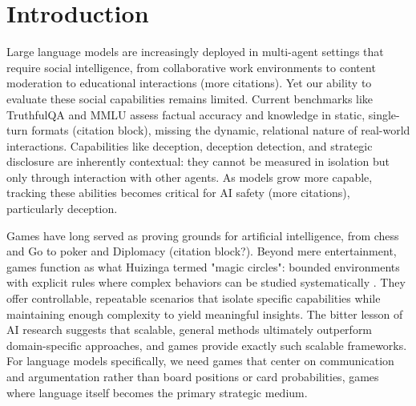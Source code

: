\documentclass{article}
\begin{document}
\section{Introduction}

Large language models are increasingly deployed in multi-agent settings that require social intelligence, from collaborative work environments to content moderation to educational interactions \citep{bubeck2023sparks, park2023generative} (more citations). Yet our ability to evaluate these social capabilities remains limited. Current benchmarks like TruthfulQA and MMLU assess factual accuracy and knowledge in static, single-turn formats (citation block), missing the dynamic, relational nature of real-world interactions. Capabilities like deception, deception detection, and strategic disclosure are inherently contextual: they cannot be measured in isolation but only through interaction with other agents. As models grow more capable, tracking these abilities becomes critical for AI safety \citep{perez2023discovering} (more citations), particularly deception.

Games have long served as proving grounds for artificial intelligence, from chess and Go to poker and Diplomacy (citation block?). Beyond mere entertainment, games function as what Huizinga termed "magic circles": bounded environments with explicit rules where complex behaviors can be studied systematically \citep{huizinga1938homo}. They offer controllable, repeatable scenarios that isolate specific capabilities while maintaining enough complexity to yield meaningful insights. The bitter lesson of AI research \cite{sutton2019bitter} suggests that scalable, general methods ultimately outperform domain-specific approaches, and games provide exactly such scalable frameworks. For language models specifically, we need games that center on communication and argumentation rather than board positions or card probabilities, games where language itself becomes the primary strategic medium.
\end{document}

